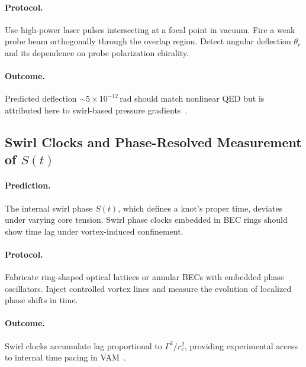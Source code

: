 \documentclass[preprint]{revtex4-2}
\begin{document}
            \paragraph{Protocol.}
            Use high-power laser pulses intersecting at a focal point in vacuum. Fire a weak probe beam orthogonally through the overlap region. Detect angular deflection \( \theta_r \) and its dependence on probe polarization chirality.
        
            \paragraph{Outcome.}
            Predicted deflection \( \sim 5 \times 10^{-12} \, \text{rad} \) should match nonlinear QED but is attributed here to swirl-based pressure gradients~\cite{moffatt1969knottedness}.
        
            \subsection{Swirl Clocks and Phase-Resolved Measurement of \( S(t) \)}
            \paragraph{Prediction.}
            The internal swirl phase \( S(t) \), which defines a knot’s proper time, deviates under varying core tension. Swirl phase clocks embedded in BEC rings should show time lag under vortex-induced confinement.
        
            \paragraph{Protocol.}
            Fabricate ring-shaped optical lattices or annular BECs with embedded phase oscillators. Inject controlled vortex lines and measure the evolution of localized phase shifts in time.
        
            \paragraph{Outcome.}
            Swirl clocks accumulate lag proportional to \( \Gamma^2 / r_c^2 \), providing experimental access to internal time pacing in VAM~\cite{volovik2003universe}.
        
\end{document}
